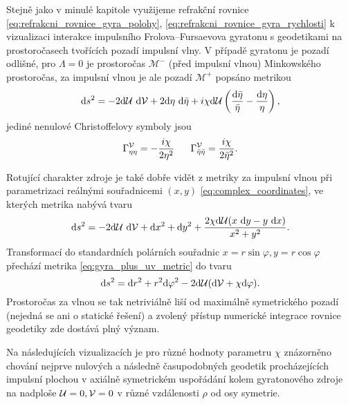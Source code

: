 Stejně jako v minulé kapitole využijeme refrakční rovnice \eqref{eq:refrakcni_rovnice_gyra_polohy}, \eqref{eq:refrakcni_rovnice_gyra_rychlosti}
k vizualizaci interakce impulsního Frolova--Fursaevova gyratonu s geodetikami na prostoročasech tvořících pozadí impulsní vlny.
V případě gyratonu je pozadí odlišné, pro $\Lambda = 0$ je prostoročas $\mathcal{M}^{-}$ (před impulsní vlnou) Minkowského prostoročas,
za impulsní vlnou je ale pozadí $\mathcal{M}^+$ popsáno metrikou
\begin{equation}
    \mathrm{d} s^2 = - 2 \mathrm{d} \mathcal{U} ~ \mathrm{d} \mathcal{V} + 2 \mathrm{d} \eta ~ \mathrm{d} \bar{\eta} + i \chi \mathrm{d} \mathcal{U} \left(\frac{\mathrm{d} \bar{\eta}}{\bar{\eta}} - \frac{\mathrm{d} \eta}{\eta}\right),
\end{equation}
jediné nenulové Christoffelovy symboly jsou
\begin{equation}
    \Gamma^{\mathcal{V}}_{\eta \eta} = - \frac{i \chi}{2 \eta^2} ~~~~~ \Gamma^{\mathcal{V}}_{\bar{\eta}\bar{\eta}} = \frac{i \chi}{2 \bar{\eta}^2}.
\end{equation}

Rotující charakter zdroje je také dobře vidět z metriky za impulsní vlnou při parametrizaci reálnými souřadnicemi $(x, y)$ \eqref{eq:complex_coordinates},
ve kterých metrika nabývá tvaru
\begin{equation}
    \label{eq:gyra_plus_uv_metric}
    \mathrm{d} s^2 = -2 \mathrm{d} \mathcal{U} ~ \mathrm{d} \mathcal{V} + \mathrm{d} x^2 + \mathrm{d} y^2 + \frac{2 \chi \mathrm{d} \mathcal{U} (x~\mathrm{d} y - y~\mathrm{d} x)}{x^2 + y^2}.
\end{equation}
Transformací do standardních polárních souřadnic $x = r \sin{\varphi}, y = r \cos{\varphi}$ přechází metrika \eqref{eq:gyra_plus_uv_metric} do tvaru
\begin{equation}
    \mathrm{d} s^2 = \mathrm{d} r^2 + r^2 \mathrm{d} \varphi^2 - 2 \mathrm{d} \mathcal{U} (\mathrm{d} \mathcal{V} + \chi \mathrm{d} \varphi).
\end{equation}
Prostoročas za vlnou se tak netriviálně liší od maximálně symetrického pozadí (nejedná se ani o statické řešení) a zvolený přístup
numerické integrace rovnice geodetiky zde dostává plný význam.

Na následujících vizualizacích je pro různé hodnoty parametru $\chi$ znázorněno chování nejprve nulových a následně časupodobných geodetik procházejících impulsní plochou v
axiálně symetrickém uspořádání kolem gyratonového zdroje na nadploše $\mathcal{U} = 0, \mathcal{V}=0$ v různé vzdálenosti $\rho$ od osy symetrie.


